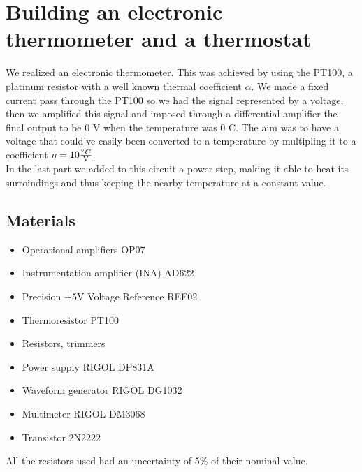 \chapter{Building an electronic thermometer and a thermostat}
We realized an electronic thermometer. This was achieved by using the PT100, a platinum resistor with a well known thermal coefficient $\alpha$. We made a fixed current pass through the PT100 so we had the signal represented by a voltage, then we amplified this signal and imposed through a differential amplifier the final output to be 0 V when the temperature was 0 \degree C. The aim was to have a voltage that could've easily been converted to a temperature by multipling it to a coefficient $\eta = 10 \frac{\degree C}{\text{V}}$.\\
In the last part we added to this circuit a power step, making it able to heat its surroindings and thus keeping the nearby temperature at a constant value.

\section{Materials}
\begin{itemize}
\item Operational amplifiers OP07
\item Instrumentation amplifier (INA) AD622
\item Precision +5V Voltage Reference REF02
\item Thermoresistor PT100
\item Resistors, trimmers
\item Power supply RIGOL DP831A
\item Waveform generator RIGOL DG1032
\item Multimeter RIGOL DM3068
\item Transistor 2N2222
\end{itemize}
All the resistors used had an uncertainty of 5\% of their nominal value.

